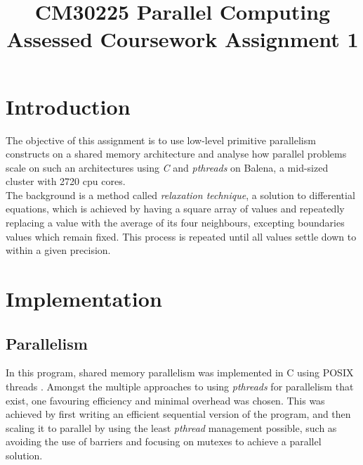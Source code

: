 \documentclass[letterpaper,12pt]{article}
\begin{document}
\title{CM30225 Parallel Computing\\Assessed Coursework Assignment 1}
\author{\vspace{-5ex}}
\date{\vspace{-5ex}}
\maketitle



\section{Introduction}

The objective of this assignment is to use low-level primitive parallelism constructs on a shared memory architecture and analyse how parallel problems scale on such an architectures using \textit{C} and \textit{pthreads} on Balena, a mid-sized cluster with 2720 cpu cores\cite{balena_notes}.\\

The background is a method called \textit{relaxation technique}, a solution to differential equations, which is achieved by having a square array of values and repeatedly replacing a value with the average of its four neighbours, excepting boundaries values which remain fixed. This process is repeated until all values settle down to within a given precision.



\section{Implementation}

\subsection{Parallelism}
\label{sec:implementation_parallelism}

In this program, shared memory parallelism was implemented in C using POSIX threads \cite{posix_threads}. Amongst the multiple approaches to using \textit{pthreads} for parallelism that exist, one favouring efficiency and minimal overhead was chosen. This was achieved by first writing an efficient sequential version of the program, and then scaling it to parallel by using the least \textit{pthread} management possible, such as avoiding the use of barriers and focusing on mutexes to achieve a parallel solution.\\
\end{document}
